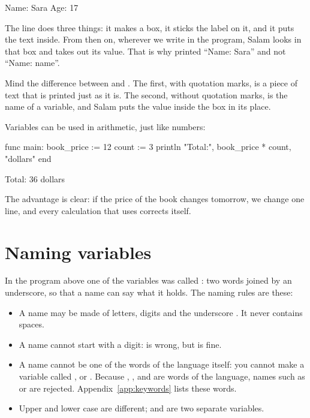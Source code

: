 \begin{salamout}
Name: Sara
Age: 17
\end{salamout}

The line  does three things: it makes a box, it sticks
the label  on it, and it puts the text  inside.
From then on, wherever we write  in the program, Salam looks in
that box and takes out its value. That is why 
printed ``Name: Sara'' and not ``Name: name''.

\begin{note}
Mind the difference between  and . The first, with
quotation marks, is a piece of text that is printed just as it is. The
second, without quotation marks, is the name of a variable, and Salam puts
the value inside the box in its place.
\end{note}

Variables can be used in arithmetic, just like numbers:

\begin{salamcode}
func main:
    book_price := 12
    count := 3
    println "Total:", book_price * count, "dollars"
end
\end{salamcode}

\begin{salamout}
Total: 36 dollars
\end{salamout}

The advantage is clear: if the price of the book changes tomorrow, we change
one line, and every calculation that uses  corrects itself.

\section{Naming variables}

In the program above one of the variables was called : two
words joined by an underscore, so that a name can say what it holds. The
naming rules are these:
\begin{itemize}
  \item A name may be made of letters, digits and the underscore \code{\_}.
        It never contains spaces.
  \item A name cannot start with a digit:  is wrong, but
         is fine.
  \item A name cannot be one of the words of the language itself: you
        cannot make a variable called ,  or
        . Because , ,  and 
        are words of the language, names such as  or 
        are rejected. Appendix~\ref{app:keywords} lists
        these words.
  \item Upper and lower case are different;  and  are two
        separate variables.
\end{itemize}

